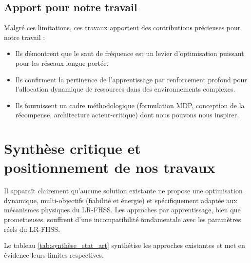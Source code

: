 \subsection{Apport pour notre travail}

Malgré ces limitations, ces travaux apportent des contributions précieuses pour notre travail :

\begin{itemize}
	\item Ils démontrent que le saut de fréquence est un levier d'optimisation puissant pour les réseaux longue portée.
	\item Ils confirment la pertinence de l'apprentissage par renforcement profond pour l'allocation dynamique de ressources dans des environnements complexes.
	\item Ils fournissent un cadre méthodologique (formulation MDP, conception de la récompense, architecture acteur-critique) dont nous pouvons nous inspirer.
\end{itemize}

\section{Synthèse critique et positionnement de nos travaux}
Il apparaît clairement qu'aucune solution existante ne propose une optimisation dynamique, multi-objectifs (fiabilité et énergie) et spécifiquement adaptée aux mécanismes physiques du LR-FHSS. Les approches par apprentissage, bien que prometteuses, souffrent d'une incompatibilité fondamentale avec les paramètres réels du LR-FHSS.

Le tableau \ref{tab:synthèse_etat_art} synthétise les approches existantes et met en évidence leurs limites respectives.

